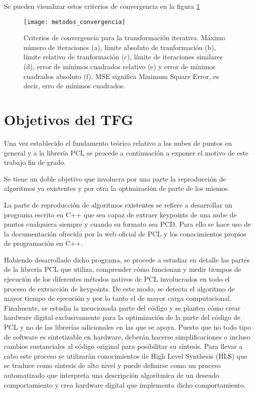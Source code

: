 Se pueden visualizar estos criterios de convergencia en la figura \ref{fig:metodos_convergencia}

\begin{figure}
\centering
\texttt{[image: metodos\_convergencia]}
\caption{Criterios de convergencia para la transformación iterativa. Máximo número de iteraciones (a), límite absoluto de tranformación (b), límite relativo de tranformación (c), límite de iteraciones similares (d), error de mínimos cuadrados relativo (e) y error de mínimos cuadrados absoluto (f). MSE significa Minimum Square Error, es decir, erro de mínimos cuadrados. }\label{fig:metodos_convergencia}
\end{figure}



\section{Objetivos del TFG}
Una vez establecido el fundamento teórico relativo a las nubes de puntos en general y a la librería PCL se procede a continuación a exponer el motivo de este trabajo fin de grado.

Se tiene un doble objetivo que involucra por una parte la reproducción de algoritmos ya existentes y por otra la optimización de parte de los mismos.

La parte de reproducción de algoritmos existentes se refiere a desarrollar un programa escrito en C++ que sea capaz de extraer keypoints de una nube de puntos cualquiera siempre y cuando su formato sea PCD. Para ello se hace uso de la documentación ofrecida por la web oficial de PCL y los conocimientos propios de programación en C++. 

Habiendo desarrollado dicho programa, se procede a estudiar en detalle las partes de la librería PCL que utiliza, comprender cómo funcionan y medir tiempos de ejecución de los diferentes métodos nativos de PCL involucrados en todo el proceso de extracción de keypoints. De este modo, se detecta el algoritmo de mayor tiempo de ejecución y por lo tanto el de mayor carga computacional. Finalmente, se estudia la mencionada parte del código y se plantea cómo crear hardware digital exclusivamente para la optimización de la parte del código de PCL y no de las librerías adicionales en las que se apoya. Puesto que no todo tipo de software es sintetizable en hardware, deberán hacerse simplificaciones o incluso cambios sustanciales al código original para posibilitar su síntesis. Para llevar a cabo este proceso se utilizarán conocimientos de High Level Synthesis (HLS) que se traduce como síntesis de alto nivel y puede definirse como un proceso automatizado que interpreta una descripción algorítmica de un deseado comportamiento y crea hardware digital que implementa dicho comportamiento.

